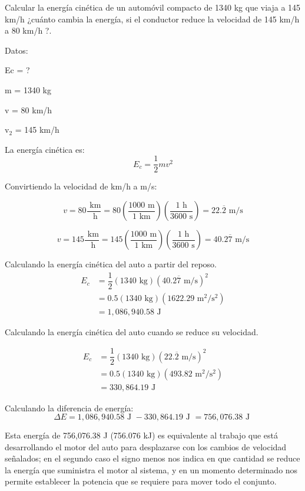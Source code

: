\question[10] Calcular la energía cinética de un automóvil compacto de 1340 kg que viaja a 145 km/h ¿cuánto cambia la energía, si el conductor reduce la velocidad de 145 km/h a 80 km/h ?.

\begin{solutionbox}{8cm}
    \begin{multicols}{2}
        Datos:

        Ec = ?

        m = 1340 kg

        v = 80 km/h

        v$_2$ = 145 km/h

        La energía cinética es:
        \[E_c=\frac{1}{2}mv^2\]

        Convirtiendo la velocidad de km/h a m/s:

        \[v=80\dfrac{\text{ km}}{\text{ h}}=80\left(\dfrac{1000 \text{ m}}{1 \text{ km}}\right)\left(\dfrac{1 \text{ h}}{3600 \text{ s}}\right)=22.\overline{2} \text{ m/s}\]

        \[v=145\dfrac{\text{ km}}{\text{ h}}=145\left(\dfrac{1000 \text{ m}}{1 \text{ km}}\right)\left(\dfrac{1 \text{ h}}{3600 \text{ s}}\right)=40.2\overline{7} \text{ m/s}\]

        \vspace{2cm}

        Calculando la energía cinética del auto a partir del reposo.
        \[
            \begin{array}{rl}
                E_c & = \dfrac{1}{2} (1340 \text{ kg})(40.2\overline{7} \text{ m/s})^2 \\[1em]
                    & = 0.5 (1340 \text{ kg})(1622.29 \text{ m$^2$/s$^2$})             \\[1em]
                    & =1,086,940.58 \text{ J }
            \end{array}
        \]

        Calculando la energía cinética del auto cuando se reduce su velocidad.

        \[
            \begin{array}{rl}
                E_c & = \dfrac{1}{2} (1340 \text{ kg})(22.\overline{2} \text{ m/s})^2 \\[1em]
                    & = 0.5 (1340 \text{ kg})(493.82 \text{ m$^2$/s$^2$})             \\[1em]
                    & =330,864.19 \text{ J }
            \end{array}
        \]

        Calculando la diferencia de energía:
        \[\Delta E = 1,086,940.58 \text{ J } - 330,864.19 \text{ J } = 756,076.38 \text{ J } \]

        Esta energía de 756,076.38 J (756.076 kJ) es equivalente al trabajo que está desarrollando el motor del auto para desplazarse con los cambios de velocidad señalados; en el segundo caso el signo menos nos indica en que cantidad se reduce la energía que suministra el motor al sistema, y en un momento determinado nos permite establecer la potencia que se requiere para mover todo el conjunto.
    \end{multicols}
\end{solutionbox}
